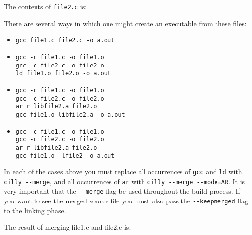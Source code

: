 \documentclass{article}
\def\t#1{{\tt #1}}
\begin{document}
 The contents of \t{file2.c} is:


 There are several ways in which one might create an executable from these
files:
\begin{itemize}
\item
\begin{verbatim}
gcc file1.c file2.c -o a.out
\end{verbatim}

\item 
\begin{verbatim}
gcc -c file1.c -o file1.o
gcc -c file2.c -o file2.o
ld file1.o file2.o -o a.out
\end{verbatim}

\item 
\begin{verbatim}
gcc -c file1.c -o file1.o
gcc -c file2.c -o file2.o
ar r libfile2.a file2.o
gcc file1.o libfile2.a -o a.out
\end{verbatim}

\item 
\begin{verbatim}
gcc -c file1.c -o file1.o
gcc -c file2.c -o file2.o
ar r libfile2.a file2.o
gcc file1.o -lfile2 -o a.out
\end{verbatim}
\end{itemize}

 In each of the cases above you must replace all occurrences of \t{gcc} and
\t{ld} with \t{cilly -{}-merge}, and all occurrences of \t{ar} with \t{cilly
-{}-merge -{}-mode=AR}. It is very important that the \t{-{}-merge} flag be used
throughout the build process. If you want to see the merged source file you
must also pass the \t{-{}-keepmerged} flag to the linking phase. 

 The result of merging file1.c and file2.c is:
\end{document}
